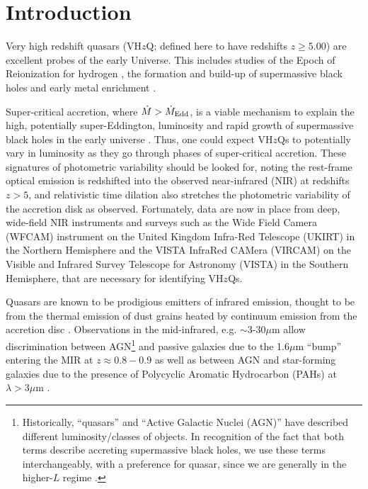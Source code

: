 \documentclass[usenatbib]{mnras}
\begin{document}
\section{Introduction}
Very high redshift quasars (VH$z$Q; defined here to have redshifts
$z\geq5.00$) are excellent probes of the early Universe. This includes
studies of the Epoch of Reionization for hydrogen \citep[see e.g.][for
reviews]{Fan2006review, Mortlock2016}, the formation and build-up of
supermassive black holes \citep[e.g., ][]{Rees1984, WyitheLoeb2003,
Volonteri2010, Agarwal2016, Valiante2018, Latif2018, Wise2019} and
early metal enrichment \citep[see e.g., ][]{Simcoe2012, Chen2017,
Bosman2017}.

Super-critical accretion, where $\dot{M} > \dot{M}_{\rm Edd}$, is a
viable mechanism to explain the high, potentially super-Eddington,
luminosity and rapid growth of supermassive black holes in the early
universe \citep[e.g.,][]{AlexanderNatarajan2014, MadauHaardtDotti2014,
Volonteri2015, Pezzulli2016, Lupi2016, Pezzulli2017, Takeo2018}. Thus,
one could expect VH$z$Qs to potentially vary in luminosity as they go
through phases of super-critical accretion. These signatures of
photometric variability should be looked for, noting the rest-frame
optical emission is redshifted into the observed near-infrared (NIR)
at redshifts $z>5$, and relativistic time dilation also stretches the
photometric variability of the accretion disk as observed.
Fortunately, data are now in place from deep, wide-field NIR
instruments and surveys such as the Wide Field Camera (WFCAM)
instrument on the United Kingdom Infra-Red Telescope (UKIRT) in the
Northern Hemisphere and the VISTA InfraRed CAMera (VIRCAM) on the
Visible and Infrared Survey Telescope for Astronomy (VISTA) in the
Southern Hemisphere, that are necessary for identifying VH$z$Qs.

Quasars are known to be prodigious emitters of infrared emission,
thought to be from the thermal emission of dust grains heated by
continuum emission from the accretion disc
\citep[e.g.,][]{Richards2006b, Leipski2014, Hill2014,
Hickox2017}. Observations in the mid-infrared, e.g. $\sim$3-30$\mu$m
allow discrimination between AGN\footnote{Historically, ``quasars''
and ``Active Galactic Nuclei (AGN)'' have described different
luminosity/classes of objects. In recognition of the fact that both
terms describe accreting supermassive black holes, we use these terms
interchangeably, with a preference for quasar, since we are generally
in the higher-$L$ regime \citep[e.g.][]{Haardt2016book}.}  and passive
galaxies due to the 1.6$\mu$m ``bump'' entering the MIR at
$z\approx0.8-0.9$ \citep[e.g., ][]{Wright1994, Sawicki2002, Lacy2004,
Stern2005, Richards2006b, Timlin2016} as well as between AGN and
star-forming galaxies due to the presence of Polycyclic Aromatic
Hydrocarbon (PAHs) at $\lambda >3\mu$m \citep[e.g., ][]{Yan2007,
Tielens2008}.
\end{document}
